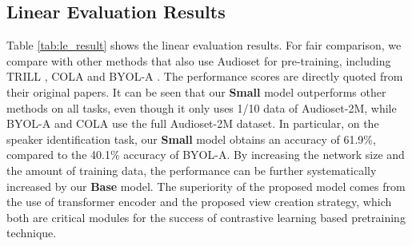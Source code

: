\begin{comment}
\subsubsection{Number of blocks used for evaluation}
Figure \ref{fig:blocks}  shows the linear evaluation result of using different number of blocks for evaluation. In general, using more blocks leads to better performance. this is agreement with findings in speech representation study using transformer\cite{yang_superb_2021}. 

\textbf{Impact of length of segment}:
We further study the impact of length of segment, as is shown in Table \ref{tab:length}. Here we use two segments and vary the length. 

\textbf{Impact of patch shape}:
We study the impact of different patch shapes, as is shown in Table \ref{tab:shape}.
\end{comment}



\subsection{Linear Evaluation Results}

Table \ref{tab:le_result} shows the linear evaluation results. For fair comparison, we compare with other methods that also use Audioset for pre-training, including TRILL \cite{shor2020towards},  COLA \cite{saeed_contrastive_2020} and BYOL-A \cite{niizumi_byol_2021}. 
The performance scores are directly quoted from their original papers. It can be seen that our \textbf{Small} model outperforms other methods on all tasks, even though it only uses 1/10 data of Audioset-2M, while BYOL-A and COLA use the full Audioset-2M dataset. In particular, on the speaker identification task, our \textbf{Small} model obtains an accuracy of 61.9\%, compared to the 40.1\% accuracy of BYOL-A. By increasing the network size and the amount of training data, the performance can be further systematically increased by our \textbf{Base} model. The superiority of the proposed model comes from the use of transformer encoder and the proposed view creation strategy, which both are critical modules for the success of contrastive learning based pretraining technique. 


